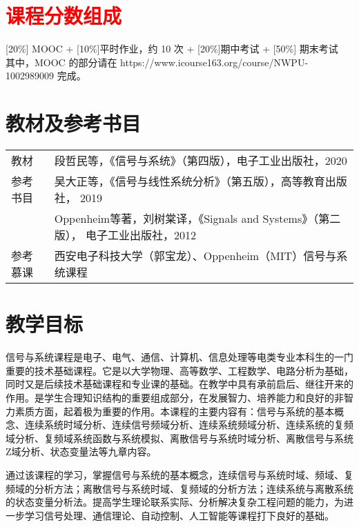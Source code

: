 \documentclass[letterpaper]{article}
\begin{document}

\section*{\textsc{\textcolor{red}{课程分数组成}}}
[20\%] MOOC + [10\%]平时作业，约 10 次 + [20\%]期中考试 + [50\%] 期末考试 \vspace{.5em}\\
其中，MOOC 的部分请在 https://www.icourse163.org/course/NWPU-1002989009 完成。


\section*{\textsc{教材及参考书目}}
\begin{tabular}{ll}
教材    & 段哲民等，《信号与系统》（第四版），电子工业出版社，2020 \vspace{.5em}\\
参考书目 & 吴大正等，《信号与线性系统分析》（第五版），高等教育出版社， 2019 \vspace{.5em} \\
& Oppenheim等著，刘树棠译，《Signals and Systems》（第二版）， 电子工业出版社，2012\vspace{.5em}\\
参考慕课 & 西安电子科技大学（郭宝龙）、Oppenheim（MIT）信号与系统课程
\end{tabular}

\section*{\textsc{教学目标}}
\quad\quad 信号与系统课程是电子、电气、通信、计算机、信息处理等电类专业本科生的一门重要的技术基础课程。它是以大学物理、高等数学、工程数学、电路分析为基础，同时又是后续技术基础课程和专业课的基础。在教学中具有承前启后、继往开来的作用。是学生合理知识结构的重要组成部分，在发展智力、培养能力和良好的非智力素质方面，起着极为重要的作用。本课程的主要内容有：信号与系统的基本概念、连续系统时域分析、连续信号频域分析、连续系统频域分析、连续系统的复频域分析、复频域系统函数与系统模拟、离散信号与系统时域分析、离散信号与系统Z域分析、状态变量法等九章内容。\par
\quad\quad 通过该课程的学习，掌握信号与系统的基本概念，连续信号与系统时域、频域、复频域的分析方法；离散信号与系统时域、复频域的分析方法；连续系统与离散系统的状态变量分析法。提高学生理论联系实际、分析解决复杂工程问题的能力，为进一步学习信号处理、通信理论、自动控制、人工智能等课程打下良好的基础。
\end{document}
